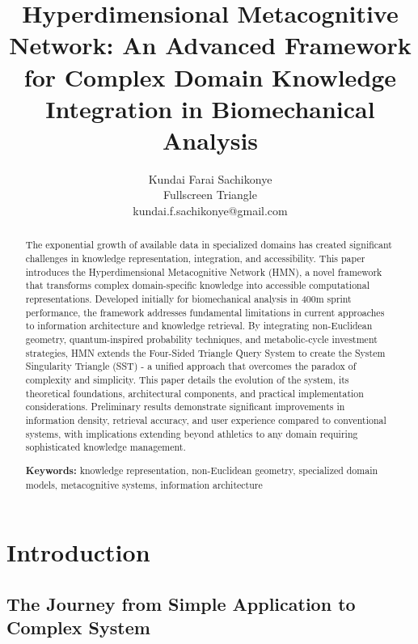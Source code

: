 \documentclass[journal,onecolumn]{IEEEtran}
\begin{document}
\title{Hyperdimensional Metacognitive Network: An Advanced Framework for Complex Domain Knowledge Integration in Biomechanical Analysis}

\author{
  Kundai Farai Sachikonye\\
  Fullscreen Triangle\\
  kundai.f.sachikonye@gmail.com
}

\maketitle

\begin{abstract}
The exponential growth of available data in specialized domains has created significant challenges in knowledge representation, integration, and accessibility. This paper introduces the Hyperdimensional Metacognitive Network (HMN), a novel framework that transforms complex domain-specific knowledge into accessible computational representations. Developed initially for biomechanical analysis in 400m sprint performance, the framework addresses fundamental limitations in current approaches to information architecture and knowledge retrieval. By integrating non-Euclidean geometry, quantum-inspired probability techniques, and metabolic-cycle investment strategies, HMN extends the Four-Sided Triangle Query System to create the System Singularity Triangle (SST) - a unified approach that overcomes the paradox of complexity and simplicity. This paper details the evolution of the system, its theoretical foundations, architectural components, and practical implementation considerations. Preliminary results demonstrate significant improvements in information density, retrieval accuracy, and user experience compared to conventional systems, with implications extending beyond athletics to any domain requiring sophisticated knowledge management.

\textbf{Keywords:} knowledge representation, non-Euclidean geometry, specialized domain models, metacognitive systems, information architecture
\end{abstract}

\section{Introduction}

\subsection{The Journey from Simple Application to Complex System}
\end{document}
